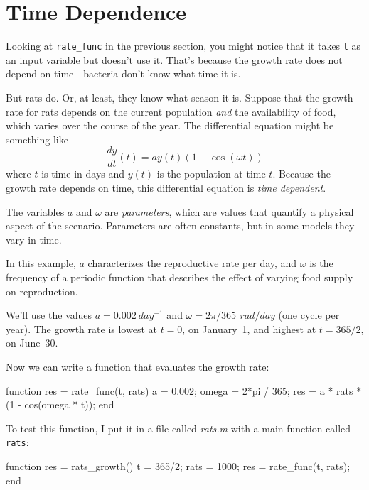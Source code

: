 \section{Time Dependence}

Looking at \lstinline{rate_func} in the previous section, you might notice that it takes \lstinline{t} as an input variable but doesn't use it.  That's because the growth rate does not depend on time---bacteria don't know what time it is.


But rats do.  Or, at least, they know what season it is.
Suppose that the growth rate for rats depends on the current population \emph{and} the availability of food, which varies over the course of the year.
The differential equation might be something like
%
\begin{equation*}
\frac{dy}{dt}(t) = a y(t) \left(1 - \cos (\omega t) \right)
\end{equation*}
%
where $t$ is time in days and $y(t)$ is the population at time $t$.
Because the growth rate depends on time, this differential equation is \emph{time dependent}.

The variables $a$ and $\omega$ are \emph{parameters}, which are values that
quantify a physical aspect of the scenario.  Parameters are often constants, but in some models they vary in time.


In this example, $a$ characterizes the reproductive rate per day, and
$\omega$ is the frequency of a periodic function that describes
the effect of varying food supply on reproduction.

We'll use the values $a = \SI{0.002}{day^{-1}}$
and $\omega = 2 \pi / 365 \, \SI{}{rad/day}$ (one cycle per year).
The growth rate is lowest at $t=0$, on January~1, and highest at $t=365/2$, on June~30.

Now we can write a function that evaluates the growth rate:

\begin{code}
function res = rate_func(t, rats)
    a = 0.002;
    omega = 2*pi / 365;
    res = a * rats * (1 - cos(omega * t));
end
\end{code}

To test this function, I put it in a file called \emph{rats.m} with a main function called
\lstinline{rats}:

\begin{code}
function res = rats_growth()
    t = 365/2;
    rats = 1000;
    res = rate_func(t, rats);
end
\end{code}

